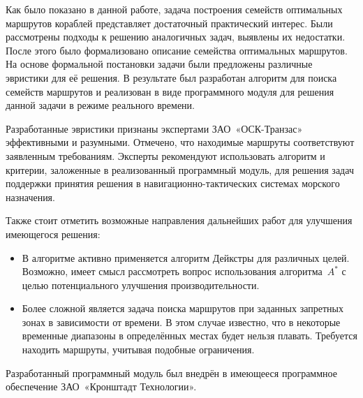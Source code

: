 \startconclusionpage

Как было показано в данной работе, задача построения семейств
оптимальных маршрутов кораблей представляет достаточный практический
интерес. Были рассмотрены подходы к решению аналогичных задач,
выявлены их недостатки. После этого было формализовано описание
семейства оптимальных маршрутов. На основе формальной постановки
задачи были предложены различные эвристики для её решения. В
результате был разработан алгоритм для поиска семейств маршрутов и
реализован в виде программного модуля для решения данной задачи в
режиме реального времени.

Разработанные эвристики признаны экспертами ЗАО~«ОСК-Транзас»
эффективными и разумными. Отмечено, что находимые маршруты
соответствуют заявленным требованиям. Эксперты рекомендуют
использовать алгоритм и критерии, заложенные в реализованный
программный модуль, для решения задач поддержки принятия решения в
навигационно-тактических системах морского назначения.

Также стоит отметить возможные направления дальнейших работ для
улучшения имеющегося решения:
\begin{itemize}
    \item В алгоритме активно применяется алгоритм Дейкстры для различных
      целей. Возможно, имеет смысл рассмотреть вопрос использования
      алгоритма~$A^*$ с целью потенциального улучшения производительности.
    \item Более сложной является задача поиска маршрутов при заданных
      запретных зонах в зависимости от времени. В этом случае
      известно, что в некоторые временные диапазоны в определённых
      местах будет нельзя плавать. Требуется находить маршруты,
      учитывая подобные ограничения.
\end{itemize}

Разработанный программный модуль был внедрён в имеющееся программное
обеспечение ЗАО~«Кронштадт Технологии».

\FloatBarrier

